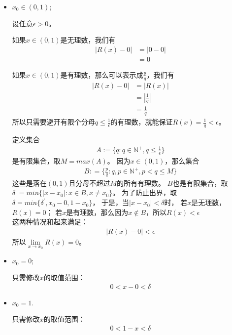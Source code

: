 \documentclass{article}
\begin{document}
\begin{itemize}
  \item $x_0 \in (0, 1)$;

        设任意$\epsilon > 0$。

        如果$x \in (0, 1)$是无理数，我们有
        \begin{align*}
          |R(x) - 0|
           & = |0 - 0| \\
           & = 0
        \end{align*}

        如果$x \in (0, 1)$是有理数，那么可以表示成$\frac{p}{q}$，我们有
        \begin{align*}
          |R(x) - 0|
           & = |R(x)|        \\
           & = |\frac{1}{q}| \\
           & = \frac{1}{q}
        \end{align*}
        所以只需要避开有限个分母$q \leq \frac{1}{\epsilon}$的有理数，就能保证$R(x) = \frac{1}{q} < \epsilon$。

        定义集合
        \begin{align*}
          A := \{q: q \in \mathbb{N}^+, q \leq \frac{1}{\epsilon}\}
        \end{align*}
        是有限集合，取$M = max(A)$。
        因为$x \in (0, 1)$，那么集合
        \begin{align*}
          B : = \{\frac{p}{q}: q, p \in \mathbb{N}^+, p < q \leq M\}
        \end{align*}
        这些是落在$(0,1)$且分母不超过$M$的所有有理数。
        $B$也是有限集合，取$\delta^\prime = min\{|x - x_0|: x \in B, x \neq x_0\}$。
        为了防止出界，取$\delta = min\{\delta^\prime, x_0 - 0, 1 - x_0\}$，
        于是，当$|x - x_0| < \delta$时，
        若$x$是无理数，$R(x) = 0$；
        若$x$是有理数，那么因为$x \notin B$，所以$R(x) < \epsilon$\\
        这两种情况和起来满足：
        \begin{align*}
          |R(x) - 0| < \epsilon
        \end{align*}
        所以$\lim\limits_{x \to x_0} R(x) = 0$。
  \item $x_0 = 0$;

        只需修改$x$的取值范围：
        \begin{align*}
          0 < x - 0 < \delta
        \end{align*}

  \item $x_0 = 1$.

        只需修改$x$的取值范围：
        \begin{align*}
          0 < 1 - x < \delta
        \end{align*}
\end{itemize}
\end{document}
